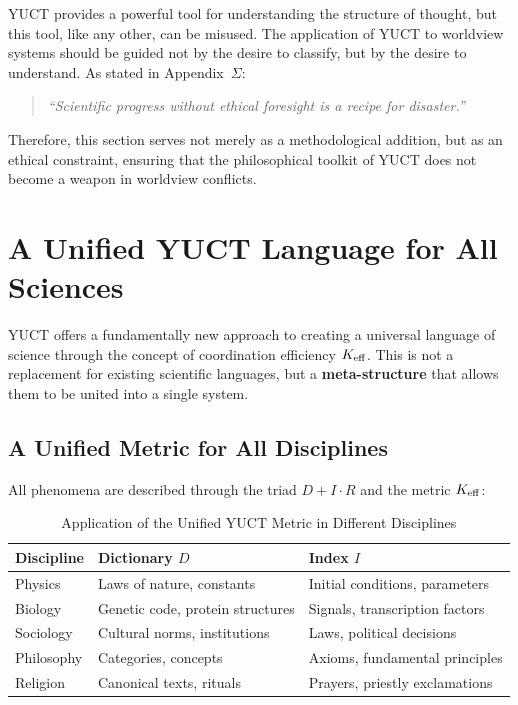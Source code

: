 \documentclass[12pt,a4paper]{article}
\begin{document}
	YUCT provides a powerful tool for understanding the structure of thought, but this tool, like any other, can be misused. The application of YUCT to worldview systems should be guided not by the desire to classify, but by the desire to understand. As stated in Appendix~$\Sigma$:
	
	\begin{quote}
		\itshape
		``Scientific progress without ethical foresight is a recipe for disaster.''
	\end{quote}
	
	Therefore, this section serves not merely as a methodological addition, but as an ethical constraint, ensuring that the philosophical toolkit of YUCT does not become a weapon in worldview conflicts.
	
	
	\section{A Unified YUCT Language for All Sciences}
	
	YUCT offers a fundamentally new approach to creating a universal language of science through the concept of coordination efficiency \(\Keff\). This is not a replacement for existing scientific languages, but a \textbf{meta-structure} that allows them to be united into a single system.
	
	\subsection{A Unified Metric for All Disciplines}
	
	All phenomena are described through the triad \(D + I \cdot R\) and the metric \(\Keff\):
	
	\begin{table}[H]
		\centering
		\caption{Application of the Unified YUCT Metric in Different Disciplines}
		\label{tab:unified-metrics}
		\begin{tabular}{p{3.5cm}p{4.5cm}p{4.5cm}}
			\toprule
			\textbf{Discipline} & \textbf{Dictionary \(D\)} & \textbf{Index \(I\)} \\
			\midrule
			Physics & Laws of nature, constants & Initial conditions, parameters \\
			Biology & Genetic code, protein structures & Signals, transcription factors \\
			Sociology & Cultural norms, institutions & Laws, political decisions \\
			Philosophy & Categories, concepts & Axioms, fundamental principles \\
			Religion & Canonical texts, rituals & Prayers, priestly exclamations \\
			\bottomrule
		\end{tabular}
	\end{table}
	
\end{document}
